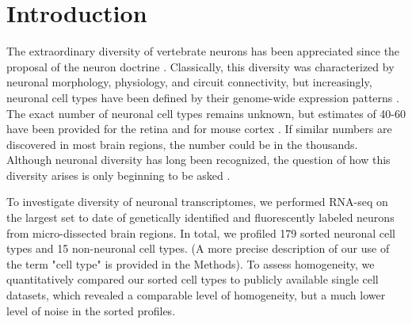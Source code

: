 \section*{Introduction}

The extraordinary diversity of vertebrate neurons has been appreciated since the proposal of the neuron doctrine \cite{Cajal_1888}. Classically, this diversity was characterized by neuronal morphology, physiology, and circuit connectivity, but increasingly, neuronal cell types have been defined by their genome-wide expression patterns \citep{Sugino_2005,Doyle_2008}. The exact number of neuronal cell types remains unknown, but estimates of 40-60 have been provided for the retina \citep{Macosko_2015,Masland_2004} and for mouse cortex \citep{Tasic_2016,Zeisel_2015}. If similar numbers are discovered in most brain regions, the number could be in the thousands. Although neuronal diversity has long been recognized, the question of how this diversity arises is only beginning to be asked \citep{Arendt_2016,Muotri_2006}. 


To investigate diversity of neuronal transcriptomes, we performed RNA-seq on the largest set to date of genetically identified and fluorescently labeled neurons from micro-dissected brain regions. In total, we profiled 179 sorted neuronal cell types and 15 non-neuronal cell types. (A more precise description of our use of the term "cell type" is provided in the Methods). To assess  homogeneity, we quantitatively compared our sorted cell types to publicly available single cell datasets, which revealed a comparable level of homogeneity, but a much lower level of noise in the sorted profiles. 

